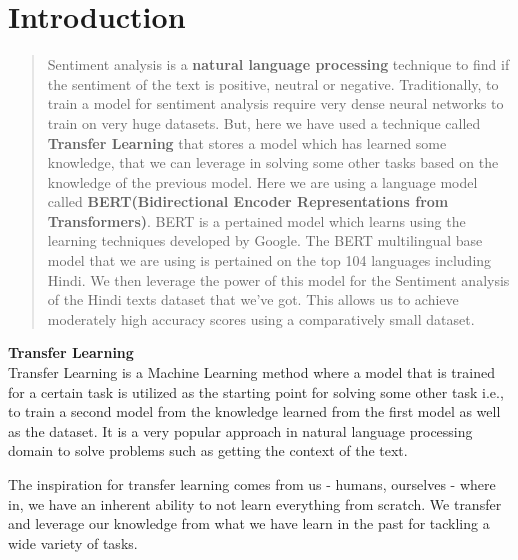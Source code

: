\documentclass[a4paper, 12pt]{article}
\begin{document}
\begin{sloppypar}

\tableofcontents
\thispagestyle{empty}
\clearpage
\setcounter{page}{1}
\section{Introduction}
\begin{abstract}
\noindent Sentiment analysis is a \textbf{natural language processing} technique to find if the sentiment of the text is positive, neutral or negative. Traditionally, to train a model for sentiment analysis require very dense neural networks to train on very huge datasets. But, here we have used a technique called \textbf{Transfer Learning} that stores a model which has learned some knowledge, that we can leverage in solving some other tasks based on the knowledge of the previous model. Here we are using a language model called  \textbf{BERT(Bidirectional Encoder Representations from Transformers)}. BERT is a pertained model which learns using the learning techniques developed by Google. The BERT multilingual base model that we are using is pertained on the top 104 languages including Hindi. We then leverage the power of this model for the Sentiment analysis of the Hindi texts dataset that we've got. This allows us to achieve moderately high accuracy scores using a comparatively small dataset.
\end{abstract}

\large \textbf{Transfer Learning} \\ [0.5ex]
\normalsize
Transfer Learning is a Machine Learning method where a model that is trained for a certain task is utilized as the starting point for solving some other task i.e., to train a second model from the knowledge learned from the first model as well as the dataset. It is a very popular approach in natural language processing domain to solve problems such as getting the context of the text.

The inspiration for transfer learning comes from us - humans, ourselves - where in, we have an inherent ability to not learn everything from scratch. We transfer and leverage our knowledge from what we have learn in the past for tackling a wide variety of tasks.\cite{sarkar_deep_2018}


\end{sloppypar}
\end{document}
